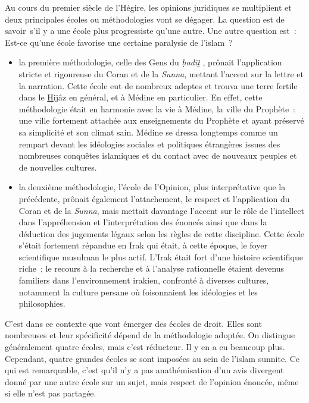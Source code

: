 Au cours du premier siècle de l'Hégire, les opinions juridiques se
multiplient et deux principales écoles ou méthodologies vont se dégager.
La question est de savoir~s'il y a une école plus progressiste qu'une
autre. Une autre question est~: Est-ce qu'une école favorise une
certaine paralysie de l'islam~?
\begin{itemize}
    \item la première méthodologie, celle des Gens du \emph{ḥadīṯ} , prônait
l'application stricte et rigoureuse du Coran et de la \emph{Sunna},
mettant l'accent sur la lettre et la narration. Cette école eut de
nombreux adeptes et trouva une terre fertile dans le \underline{H}ijâz
en général, et à Médine en particulier. En effet, cette méthodologie
était en harmonie avec la vie à Médine, la ville du Prophète~: une ville
fortement attachée aux enseignements du Prophète et ayant préservé sa
simplicité et son climat sain. Médine se dressa longtemps comme un
rempart devant les idéologies sociales et politiques étrangères issues
des nombreuses conquêtes islamiques et du contact avec de nouveaux
peuples et de nouvelles cultures.
\item  la deuxième méthodologie, l'école de l'Opinion, plus interprétative
que la précédente, prônait également l'attachement, le respect et
l'application du Coran et de la \emph{Sunna}, mais mettait davantage
l'accent sur le rôle de l'intellect dans l'appréhension et
l'interprétation des énoncés ainsi que dans la déduction des jugements
légaux selon les règles de cette discipline. Cette école s'était
fortement répandue en Irak qui était, à cette époque, le foyer
scientifique musulman le plus actif. L'Irak était fort d'une histoire
scientifique riche~; le recours à la recherche et à l'analyse
rationnelle étaient devenus familiers dans l'environnement irakien,
confronté à diverses cultures, notamment la culture persane où
foisonnaient les idéologies et les philosophies.
\end{itemize}

C'est dans ce contexte que vont émerger des écoles de droit. Elles sont
nombreuses et leur spécificité dépend de la méthodologie adoptée. On
distingue généralement quatre écoles, mais c'est réducteur. Il y en a eu
beaucoup plus. Cependant, quatre grandes écoles se sont imposées au sein
de l'islam sunnite. Ce qui est remarquable, c'est qu'il n'y a pas
anathémisation d'un avis divergent donné par une autre école sur un
sujet, mais respect de l'opinion énoncée, même si elle n'est pas
partagée.

